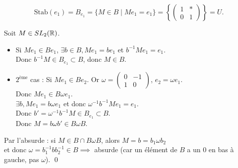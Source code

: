 \begin{center}
\end{center}

\[ \text{Stab}(e_1) = B_{e_1} = \{ M \in B \mid M e_1 = e_1 \} = \left\{ \begin{pmatrix} 1 & * \\ 0 & 1 \end{pmatrix} \right\} = U. \]

Soit $M \in SL_2(\mathbb{R})$.
\begin{itemize}
    \item Si $M e_1 \in B e_1$, $\exists b \in B, M e_1 = b e_1$ et $b^{-1} M e_1 = e_1$. \\
    Donc $b^{-1} M \in B_{e_1} \subset B$, donc $M \in B$.

    \item $2^{\text{ème}}$ cas : Si $M e_1 \in B e_2$. Or $\omega = \begin{pmatrix} 0 & -1 \\ 1 & 0 \end{pmatrix}$, $e_2 = \omega e_1$. \\
    Donc $M e_1 \in B \omega e_1$. \\
    $\exists b, M e_1 = b \omega e_1$ et donc $\omega^{-1} b^{-1} M e_1 = e_1$. \\
    Donc $b' = \omega^{-1} b^{-1} M \in B_{e_1} \subset B$. \\
    Donc $M = b \omega b' \in B \omega B$.
\end{itemize}

Par l'absurde : si $M \in B \cap B \omega B$, alors $M = b = b_1 \omega b_2$ \\
et donc $\omega = b_1^{-1} b b_2^{-1} \in B \implies$ absurde (car un élément de $B$ a un 0 en bas à gauche, pas $\omega$).
\qed

